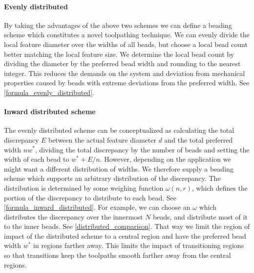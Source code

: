 \paragraph{Evenly distributed}
By taking the advantages of the above two schemes we can define a beading scheme which constitutes a novel toolpathing technique.
We can evenly divide the local feature diameter over the widths of all beads, but choose a local bead count better matching the local feature size.
We determine the local bead count by dividing the diameter by the preferred bead width and rounding to the nearest integer.
This reduces the demands on the system and deviation from mechanical properties caused by beads with extreme deviations from the preferred width.
See \cref{formula_evenly_distributed}.






\paragraph{Inward distributed scheme}
The evenly distributed scheme can be conceptualized as calculating the total discrepancy $E$ between the actual feature diameter $d$ and the total preferred width $n w^*$, dividing the total discrepancy by the number of beads and setting the width of each bead to 
$w^* + E / n$.
However, depending on the application we might want a different distribution of widths.
We therefore supply a beading scheme which supports an arbitrary distribution of the discrepancy.
The distribution is determined by some weighing function $\omega(n,r)$, which defines the portion of the discrepancy to distribute to each bead.
See \cref{formula_inward_distributed}.
For example, we can choose an $\omega$ which distributes the discrepancy over the innermost $N$ beads, and distribute most of it to the inner beads.
See \cref{distributed_comparison}.
That way we limit the region of impact of the distributed scheme to a central region and have the preferred bead width $w^*$ in regions farther away.
This limits the impact of transitioning regions so that transitions keep the toolpaths smooth farther away from the central regions. %






